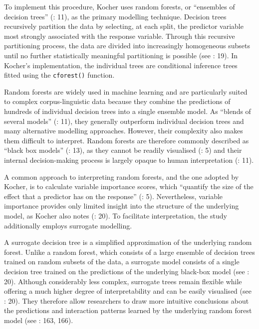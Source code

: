 \documentclass[
  letterpaper,
  DIV=11,
  numbers=noendperiod]{scrartcl}
\begin{document}
To implement this procedure, Kocher uses random forests, or ``ensembles
of decision trees'' (: 11), as the primary modelling technique. Decision trees
recursively partition the data by selecting, at each split, the
predictor variable most strongly associated with the response variable.
Through this recursive partitioning process, the data are divided into
increasingly homogeneous subsets until no further statistically
meaningful partitioning is possible (see
: 19). In Kocher's
implementation, the individual trees are conditional inference trees
fitted using the \texttt{cforest()} function.

Random forests are widely used in machine learning and are particularly
suited to complex corpus-linguistic data because they combine the
predictions of hundreds of individual decision trees into a single
ensemble model. As ``blends of several models''
(: 11), they
generally outperform individual decision trees and many alternative
modelling approaches. However, their complexity also makes them
difficult to interpret. Random forests are therefore commonly described
as ``black box models''
(: 13), as they
cannot be readily visualised
(: 5) and their
internal decision-making process is largely opaque to human
interpretation (:
11).

A common approach to interpreting random forests, and the one adopted by
Kocher, is to calculate variable importance scores, which ``quantify the
size of the effect that a predictor has on the response''
(: 5).
Nevertheless, variable importance provides only limited insight into the
structure of the underlying model, as Kocher also notes
(: 20). To facilitate
interpretation, the study additionally employs surrogate modelling.

A surrogate decision tree is a simplified approximation of the
underlying random forest. Unlike a random forest, which consists of a
large ensemble of decision trees trained on random subsets of the data,
a surrogate model consists of a single decision tree trained on the
predictions of the underlying black-box model (see
: 20). Although
considerably less complex, surrogate trees remain flexible while
offering a much higher degree of interpretability and can be easily
visualised (see :
20). They therefore allow researchers to draw more intuitive conclusions
about the predictions and interaction patterns learned by the underlying
random forest model (see
: 163, 166).
\end{document}

